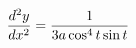\documentclass[preview]{standalone}
\begin{document}
\begin{align*}
\special{dvisvgm:raw <g id='unique000'>}\dfrac{d^2y}{dx^2}=\dfrac{1}{3a\cos^4 t\sin t}\special{dvisvgm:raw </g>}
\end{align*}
\end{document}
